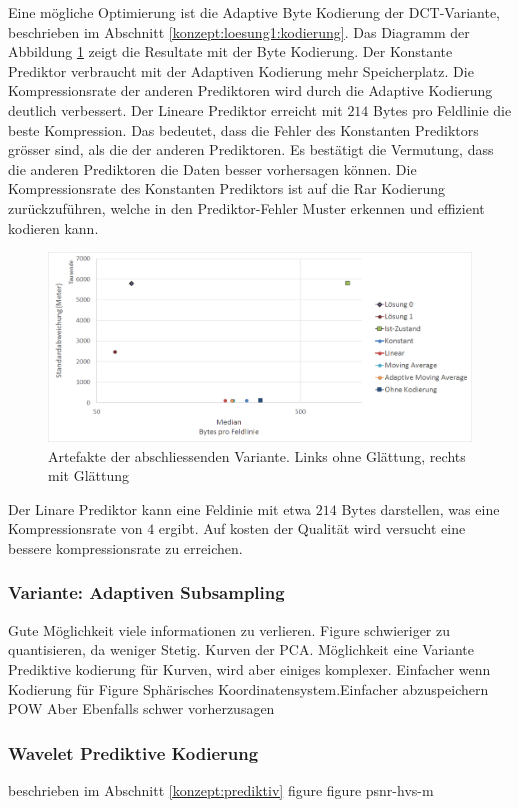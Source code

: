 Eine mögliche Optimierung ist die Adaptive Byte Kodierung der DCT-Variante, beschrieben im Abschnitt \ref{konzept:loesung1:kodierung}. Das Diagramm der Abbildung \ref{resultate:loesung2:simple:resultate_byte} zeigt die Resultate mit der Byte Kodierung. Der Konstante Prediktor verbraucht mit der Adaptiven Kodierung mehr Speicherplatz. Die Kompressionsrate der anderen Prediktoren wird durch die Adaptive Kodierung deutlich verbessert. Der Lineare Prediktor erreicht mit $214$ Bytes pro Feldlinie die beste Kompression. Das bedeutet, dass die Fehler des Konstanten Prediktors grösser sind, als die der anderen Prediktoren. Es bestätigt die Vermutung, dass die anderen Prediktoren die Daten besser vorhersagen können. Die Kompressionsrate des Konstanten Prediktors ist auf die Rar Kodierung zurückzuführen, welche in den Prediktor-Fehler Muster erkennen und effizient kodieren kann.\\ 
\begin{figure}[!htbp]
	\center
	\includegraphics[width=1\textwidth,keepaspectratio]{./pictures/resultate/loesung2/variante0/resultate_byte.png}
	\caption{Artefakte der abschliessenden Variante. Links ohne Glättung, rechts mit Glättung}
	\label{resultate:loesung2:simple:resultate_byte}
\end{figure}
Der Linare Prediktor kann eine Feldinie mit etwa $214$ Bytes darstellen, was eine Kompressionsrate von $4$ ergibt. Auf kosten der Qualität wird versucht eine bessere kompressionsrate zu erreichen.

\subsubsection{Variante: Adaptiven Subsampling}
Gute Möglichkeit viele informationen zu verlieren.
Figure
schwieriger zu quantisieren, da weniger Stetig. Kurven der PCA. Möglichkeit eine Variante Prediktive kodierung für Kurven, wird aber einiges komplexer.
Einfacher wenn Kodierung für
Figure
Sphärisches Koordinatensystem.Einfacher abzuspeichern
POW
Aber Ebenfalls schwer vorherzusagen

\subsubsection{Wavelet Prediktive Kodierung}
beschrieben im Abschnitt \ref{konzept:prediktiv}
figure
figure psnr-hvs-m
